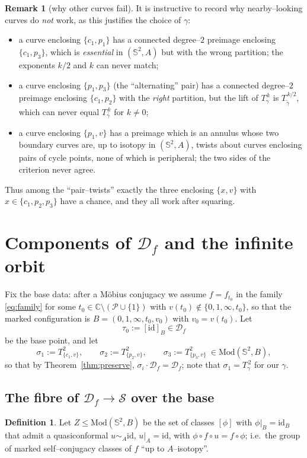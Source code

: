 \documentclass[11pt]{amsart}
\theoremstyle{plain}
\theoremstyle{definition}
\newtheorem{definition}[theorem]{Definition}
\newtheorem{remark}[theorem]{Remark}
\newcommand{\Sph}{\mathbb{S}^2}
\newcommand{\C}{\mathbb{C}}
\newcommand{\Mod}{\mathrm{Mod}}
\newcommand{\D}{\mathcal{D}}
\newcommand{\S}{\mathcal{S}}
\newcommand{\P}{\mathcal{P}}
\newcommand{\id}{\mathrm{id}}
\begin{document}
\begin{remark}[why other curves fail]
It is instructive to record why nearby--looking curves do \emph{not} work,
as this justifies the choice of $\gamma$:
\begin{itemize}
\item a curve enclosing $\{c_1,p_1\}$ has a connected degree--$2$
preimage enclosing $\{c_1,p_3\}$, which is \emph{essential} in
$(\Sph,A)$ but with the wrong partition; the exponents $k/2$ and $k$ can
never match;
\item a curve enclosing $\{p_1,p_3\}$ (the ``alternating'' pair) has a
connected degree--$2$ preimage enclosing $\{c_1,p_2\}$ with the
\emph{right} partition, but the lift of $T_\gamma^{\,k}$ is
$T_{\tilde\gamma}^{\,k/2}$, which can never equal $T_{\bar\gamma}^{\,k}$
for $k\neq0$;
\item a curve enclosing $\{p_1,v\}$ has a preimage which is an annulus
whose two boundary curves are, up to isotopy in $(\Sph,A)$, twists about
curves enclosing pairs of cycle points, none of which is peripheral; the
two sides of the criterion never agree.
\end{itemize}
Thus among the ``pair--twists'' exactly the three enclosing
$\{x,v\}$ with $x\in\{c_1,p_2,p_3\}$ have a chance, and they all work
after squaring.
\end{remark}

\section{Components of \texorpdfstring{$\D_f$}{Df} and the infinite orbit}
\label{s:components}

Fix the base data: after a M\"obius conjugacy we assume
$f=f_{t_0}$ in the family \eqref{eq:family} for some
$t_0\in\C\setminus(\P\cup\{1\})$ with $v(t_0)\notin\{0,1,\infty,t_0\}$, so
that the marked configuration is $B=(0,1,\infty,t_0,v_0)$ with
$v_0=v(t_0)$.  Let
$$\tau_0:=[\id]_B\in\D_f$$
be the base point, and let
$$\sigma_1:=T_{\{c_1,v\}}^{2},\qquad
\sigma_2:=T_{\{p_2,v\}}^{2},\qquad
\sigma_3:=T_{\{p_3,v\}}^{2}\ \in\Mod(\Sph,B),$$
so that by Theorem~\ref{thm:preserve}, $\sigma_i\cdot\D_f=\D_f$; note that
$\sigma_1=T_\gamma^{\,2}$ for our $\gamma$.

\subsection{The fibre of \texorpdfstring{$\D_f\to\S$}{Df→S} over the base}

\begin{definition}\label{def:Z}
Let $Z\le\Mod(\Sph,B)$ be the set of classes $[\phi]$ with
$\phi|_B=\id_B$ that admit a quasiconformal $u\sim_A\id$, $u|_A=\id$,
with $\phi\circ f\circ u=f\circ\phi$; i.e.\ the group of marked
self--conjugacy classes of $f$ ``up to $A$--isotopy''.
\end{definition}
\end{document}
